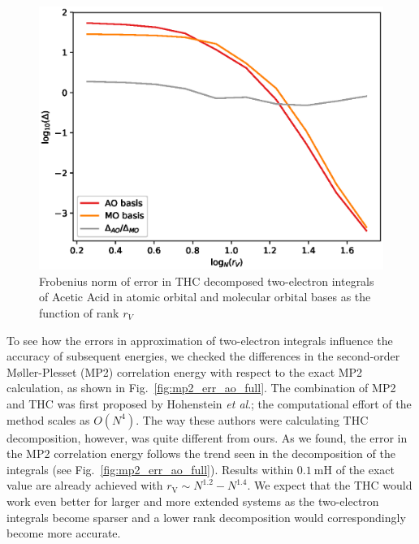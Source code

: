 \begin{figure}[tb]
\includegraphics[width=\columnwidth]{figures/thc_rccsd/thc_err_ao_vs_mo}
\caption{Frobenius norm of error in THC decomposed two-electron integrals of 
Acetic Acid in atomic orbital and molecular orbital bases as the function of 
rank $r_{V}$
\label{fig:thc_err_ao_vs_mo}}
\end{figure}
%
To see how the errors in approximation of two-electron 
integrals influence the accuracy of subsequent energies, we checked 
the differences in the second-order M{\o}ller-Plesset (MP2) correlation
energy with respect to the exact MP2 calculation, as shown in 
Fig.~\ref{fig:mp2_err_ao_full}.  The combination
of MP2 and THC was first proposed by Hohenstein \emph{et
al}.\cite{hohenstein_thc2}; the computational effort of the method scales 
as $O(N^4)$.  The way these authors were calculating THC decomposition, however, 
was quite different from ours. As we found, the error in the MP2 correlation 
energy follows the trend seen in the decomposition of the integrals (see 
Fig.~\ref{fig:mp2_err_ao_full}). Results within $0.1~\mathrm{mH}$
of the exact value are already achieved with
$r_\mathrm{V} \sim N^{1.2} - N^{1.4}$.
We expect that the THC would work even better for larger and more extended 
systems as the two-electron integrals become sparser and a lower rank 
decomposition would correspondingly become more accurate.
%
